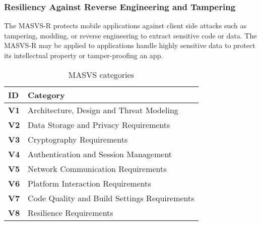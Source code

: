 \subsubsection{Resiliency Against Reverse Engineering and Tampering}
The MASVS-R protects mobile applications against client side attacks such as tampering, modding, or reverse engineering to extract sensitive code or data. The MASVS-R may be applied to applications handle highly sensitive data to protect its intellectual property or tamper-proofing an app.


\begin{table}
    \centering
    \caption{MASVS categories}
    \label{tab:masvs-categories}
    \begin{tabulary}{1.0\textwidth}{|L|L|}
        \hline
        \textbf{ID} & \textbf{Category} \\
        \hline
        \textbf{V1} & Architecture, Design and Threat Modeling \\
        \hline
        \textbf{V2} & Data Storage and Privacy Requirements \\
        \hline
        \textbf{V3} & Cryptography Requirements \\
        \hline
        \textbf{V4} & Authentication and Session Management \\
        \hline
        \textbf{V5} & Network Communication Requirements \\
        \hline
        \textbf{V6} & Platform Interaction Requirements \\
        \hline
        \textbf{V7} & Code Quality and Build Settings Requirements \\
        \hline
        \textbf{V8} & Resilience Requirements \\
        \hline
    \end{tabulary}
\end{table}


